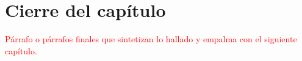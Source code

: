 \section{Cierre del capítulo} 
\textcolor{red}{Párrafo o párrafos finales que sintetizan lo hallado y empalma con el siguiente capítulo.}
 








